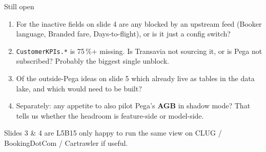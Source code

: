 \documentclass[aspectratio=169,11pt]{beamer}
\begin{document}
\begin{frame}{Still open}
  \footnotesize
  \begin{enumerate}
    \setlength\itemsep{0.7em}
    \item For the inactive fields on slide 4 \textemdash{} are any blocked by an upstream feed (Booker language, Branded fare, Days-to-flight), or is it just a config switch?
    \item \texttt{CustomerKPIs.*} is 75\,\%+ missing. Is Transavia not sourcing it, or is Pega not subscribed? Probably the biggest single unblock.
    \item Of the outside-Pega ideas on slide 5 \textemdash{} which already live as tables in the data lake, and which would need to be built?
    \item Separately: any appetite to also pilot Pega's \textbf{AGB} in shadow mode? That tells us whether the headroom is feature-side or model-side.
  \end{enumerate}
  \vspace{0.6em}
  {\scriptsize\textcolor{accgray}{Slides 3 \& 4 are L5B15 only \textemdash{} happy to run the same view on CLUG / BookingDotCom / Cartrawler if useful.}}
\end{frame}

\begin{frame}
  \vfill
  \begin{center}
    \\[1em]
    \color{white}{\rule{4em}{2pt}}\\[1em]
  \end{center}
  \vfill
\end{frame}
\end{document}
